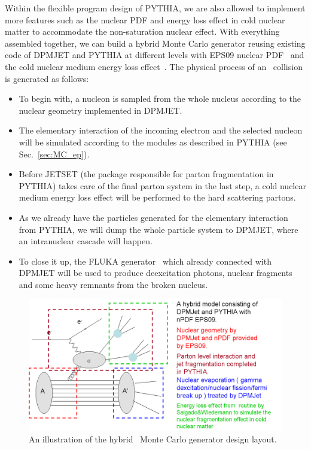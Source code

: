 Within the flexible program design of PYTHIA, we are also allowed to implement
more features such as the nuclear PDF and energy loss effect in cold nuclear
matter to accommodate the non-saturation nuclear effect. 
With everything assembled together, we can build a hybrid Monte Carlo generator reusing existing
code of DPMJET and PYTHIA at different levels with EPS09 nuclear PDF~\cite{Eskola:2009uj}
and the cold nuclear medium energy loss effect~\cite{Salgado:2003gb}. The physical process of an \eA\ collision is
generated as follows:

\begin{itemize}
    \item To begin with, a nucleon is sampled from the whole nucleus according to the nuclear geometry implemented in DPMJET.
    \item The elementary interaction of the incoming electron and the selected nucleon will be simulated according to the modules as described in PYTHIA (see Sec.~\ref{sec:MC_ep}).
    \item Before JETSET (the package responsible for parton fragmentation in PYTHIA) takes care of the final parton system in the last step, a cold nuclear medium energy loss effect will be performed to the hard scattering partons. 
    \item As we already have the particles generated for the elementary interaction from PYTHIA, we will dump the whole particle system to DPMJET, where an intranuclear cascade will happen.
    \item To close it up, the FLUKA generator~\cite{Ferrari:1995cq} which already connected with DPMJET will be used to produce deexcitation photons, nuclear fragments and some heavy remnants from the broken nucleus.
\end{itemize}

\begin{figure}
\centering
\includegraphics[width=1.0\textwidth]{plots/chpt5/eA_hybrid_chart.png} 
\caption[An illustration of the hybrid \eA\ Monte Carlo generator design layout] {
An illustration of the hybrid \eA\ Monte Carlo generator design layout. }
\label{fig:MC_hybrid_chart}
\end{figure}

